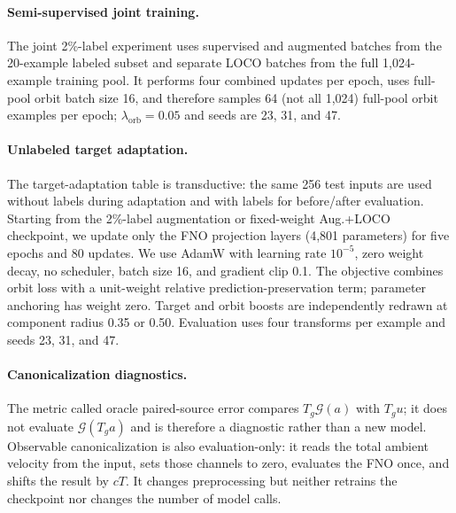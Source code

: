 \paragraph{Semi-supervised joint training.}
The joint 2\%-label experiment uses supervised and augmented batches from the
20-example labeled subset and separate LOCO batches from the full 1,024-example
training pool.  It performs four combined updates per epoch, uses full-pool orbit
batch size 16, and therefore samples 64 (not all 1,024) full-pool orbit examples per
epoch; \(\lambda_{\mathrm{orb}}=0.05\) and seeds are 23, 31, and 47.

\paragraph{Unlabeled target adaptation.}
The target-adaptation table is transductive: the same 256 test inputs are used without
labels during adaptation and with labels for before/after evaluation.  Starting from
the 2\%-label augmentation or fixed-weight Aug.+LOCO checkpoint, we update only the
FNO projection layers (4,801 parameters) for five epochs and 80 updates.  We use
AdamW with learning rate \(10^{-5}\), zero weight decay, no scheduler, batch size 16,
and gradient clip 0.1.  The objective combines orbit loss with a unit-weight relative
prediction-preservation term; parameter anchoring has weight zero.  Target and orbit
boosts are independently redrawn at component radius 0.35 or 0.50.  Evaluation uses
four transforms per example and seeds 23, 31, and 47.

\paragraph{Canonicalization diagnostics.}
The metric called oracle paired-source error compares
\(T_g\mathcal G(a)\) with \(T_gu\); it does not evaluate
\(\mathcal G(T_ga)\) and is therefore a diagnostic rather than a new model.
Observable canonicalization is also evaluation-only: it reads the total ambient
velocity from the input, sets those channels to zero, evaluates the FNO once, and
shifts the result by \(cT\).  It changes preprocessing but neither retrains the
checkpoint nor changes the number of model calls.
